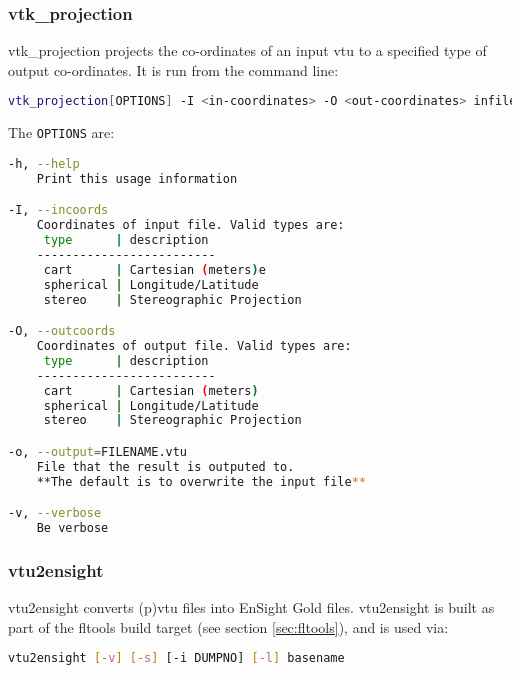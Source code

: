 \subsubsection{vtk\_projection}
\label{sec:vtkprojection}
vtk\_projection projects the co-ordinates of an input vtu to a specified type of output co-ordinates. It is run from the command line:
\begin{lstlisting}[language = Bash]
vtk_projection[OPTIONS] -I <in-coordinates> -O <out-coordinates> infile.vtu
\end{lstlisting}

The \lstinline[language = Bash]+OPTIONS+ are:
\begin{lstlisting}[language = Bash]
-h, --help
	Print this usage information

-I, --incoords
	Coordinates of input file. Valid types are:
	 type      | description
	-------------------------
	 cart      | Cartesian (meters)e
	 spherical | Longitude/Latitude
	 stereo    | Stereographic Projection

-O, --outcoords
	Coordinates of output file. Valid types are:
	 type      | description
	-------------------------
	 cart      | Cartesian (meters)
	 spherical | Longitude/Latitude
	 stereo    | Stereographic Projection

-o, --output=FILENAME.vtu
	File that the result is outputed to.
	**The default is to overwrite the input file**

-v, --verbose
	Be verbose

\end{lstlisting}


\subsubsection{vtu2ensight}
\label{sec:vtu2ensight}

vtu2ensight converts (p)vtu files into EnSight Gold files. vtu2ensight is built as part of the fltools
build target (see section \ref{sec:fltools}), and is used via:

\begin{lstlisting}[language = Bash]
vtu2ensight [-v] [-s] [-i DUMPNO] [-l] basename
\end{lstlisting}

